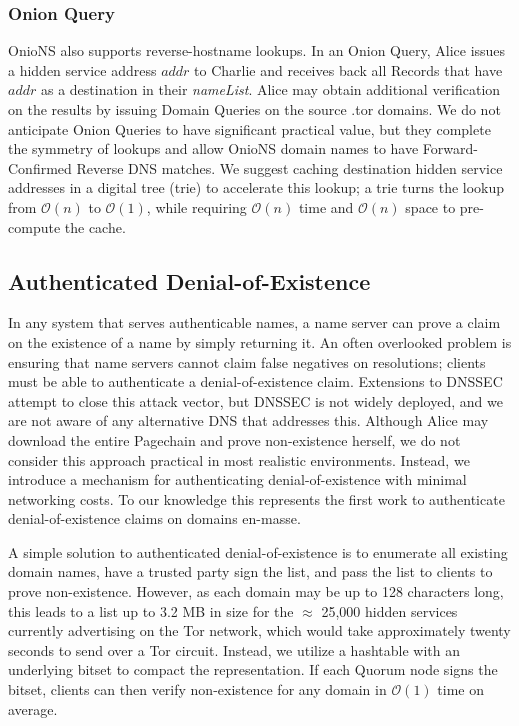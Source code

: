 \documentclass{sig-alternate}
\begin{document}
\subsubsection{Onion Query}

OnioNS also supports reverse-hostname lookups. In an Onion Query, Alice issues a hidden service address $ \mathit{addr} $ to Charlie and receives back all Records that have $ \mathit{addr} $ as a destination in their \emph{nameList}. Alice may obtain additional verification on the results by issuing Domain Queries on the source .tor domains. We do not anticipate Onion Queries to have significant practical value, but they complete the symmetry of lookups and allow OnioNS domain names to have Forward-Confirmed Reverse DNS matches. We suggest caching destination hidden service addresses in a digital tree (trie) to accelerate this lookup; a trie turns the lookup from $ \mathcal{O}(n) $ to $ \mathcal{O}(1) $, while requiring $ \mathcal{O}(n) $ time and $ \mathcal{O}(n) $ space to pre-compute the cache.

\newpage

\subsection{Authenticated Denial-of-Existence}
\label{sec:authDenial}

In any system that serves authenticable names, a name server can prove a claim on the existence of a name by simply returning it. An often overlooked problem is ensuring that name servers cannot claim false negatives on resolutions; clients must be able to authenticate a denial-of-existence claim. Extensions to DNSSEC attempt to close this attack vector, but DNSSEC is not widely deployed, and we are not aware of any alternative DNS that addresses this. Although Alice may download the entire Pagechain and prove non-existence herself, we do not consider this approach practical in most realistic environments. Instead, we introduce a mechanism for authenticating denial-of-existence with minimal networking costs. To our knowledge this represents the first work to authenticate denial-of-existence claims on domains en-masse.

A simple solution to authenticated denial-of-existence is to enumerate all existing domain names, have a trusted party sign the list, and pass the list to clients to prove non-existence. However, as each domain may be up to 128 characters long, this leads to a list up to 3.2 MB in size for the $ \approx $ 25,000 hidden services currently advertising on the Tor network, which would take approximately twenty seconds to send over a Tor circuit.\cite{TorMetrics} Instead, we utilize a hashtable with an underlying bitset to compact the representation. If each Quorum node signs the bitset, clients can then verify non-existence for any domain in $ \mathcal{O}(1) $ time on average.
 
\end{document}
